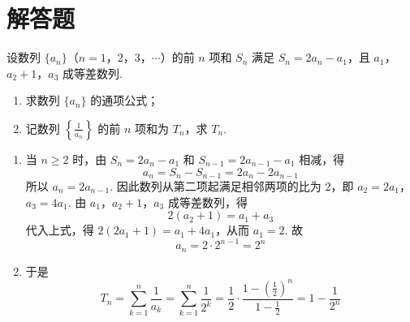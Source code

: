 \section{解答题}

\begin{problem}
设数列 \(\{a_n\}\)（\(n = 1\)，\(2\)，\(3\)，\(\cdots\)）的前 \(n\) 项和 \(S_n\) 满足 \(S_n = 2a_n - a_1\)，且 \(a_1\)，\(a_2 + 1\)，\(a_3\) 成等差数列.

\begin{enumerate}
\item 求数列 \(\{a_n\}\) 的通项公式；
\item 记数列 \(\left\{\frac{1}{a_n}\right\}\) 的前 \(n\) 项和为 \(T_n\)，求 \(T_n\).
\end{enumerate}
\end{problem}

\begin{solution}
\begin{enumerate}
\item
当 \(n\geqslant2\) 时，由 \(S_n=2a_n-a_1\) 和 \(S_{n-1}=2a_{n-1}-a_1\) 相减，得
\[
a_n=S_n-S_{n-1}=2a_n-2a_{n-1}
\]
所以 \(a_n=2a_{n-1}\). 因此数列从第二项起满足相邻两项的比为 \(2\)，即
\(a_2=2a_1\)，\(a_3=4a_1\).
由 \(a_1\)，\(a_2+1\)，\(a_3\) 成等差数列，得
\[
2(a_2+1)=a_1+a_3
\]
代入上式，得 \(2(2a_1+1)=a_1+4a_1\)，从而 \(a_1=2\). 故
\[
a_n=2\cdot2^{n-1}=2^n
\]

\item
于是
\[
T_n=\sum_{k=1}^{n}\frac1{a_k}=\sum_{k=1}^{n}\frac1{2^k}
=\frac12\cdot\frac{1-(\frac{1}{2})^n}{1-\frac{1}{2}}
=1-\frac1{2^n}
\]
\end{enumerate}
\end{solution}


